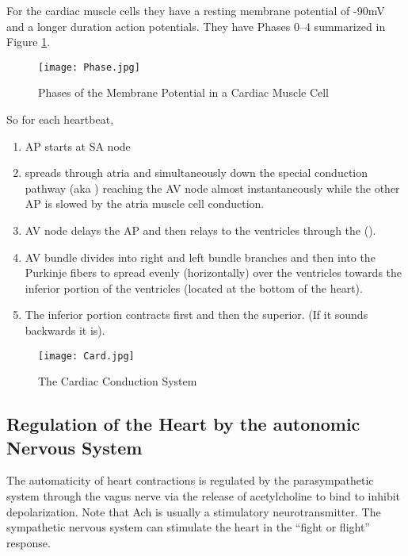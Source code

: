 \documentclass[../Bio_chemistryReview.tex]{subfiles}
\begin{document}
For the cardiac muscle cells they have a resting membrane potential of -90mV and
a longer duration action potentials. They have Phases 0--4 summarized in Figure
\ref{fig:Phases}.
\begin{figure}[H]
  \centering
  \texttt{[image: Phase.jpg]}
  \caption{Phases of the Membrane Potential in a Cardiac Muscle Cell}
  \label{fig:Phases}
\end{figure}
So for each heartbeat,
\begin{enumerate}
  \item AP starts at SA node
  \item spreads through atria and simultaneously down the special conduction
    pathway (aka ) reaching the AV node almost
    instantaneously while the other AP is slowed by the atria muscle cell
    conduction.
  \item AV node delays the AP and then relays to the ventricles through the
     ().
  \item AV bundle divides into right and left bundle branches and then into the
    Purkinje fibers to spread evenly (horizontally) over the ventricles towards
    the inferior portion of the ventricles (located at the bottom of the heart).
  \item The inferior portion contracts first and then the superior. (If it
    sounds backwards it is).
\end{enumerate}
\begin{figure}[H]
  \centering
  \texttt{[image: Card.jpg]}
  \caption{The Cardiac Conduction System}
\end{figure}
 
\subsection{Regulation of the Heart by the autonomic Nervous System}
The automaticity of heart contractions is regulated by the parasympathetic
system through the vagus nerve via the release of acetylcholine to bind to
inhibit depolarization. Note that Ach is usually a stimulatory neurotransmitter.
The sympathetic nervous system can stimulate the heart in the ``fight or
flight'' response.
\end{document}
